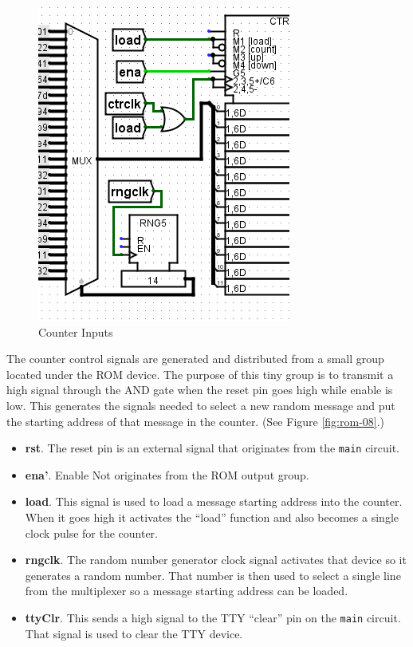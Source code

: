 \begin{figure}[H]
	\centering
	\includegraphics[width=\maxwidth{.95\linewidth}]{gfx/rom-07}
	\caption{Counter Inputs}
	\label{fig:rom-07}
\end{figure}

The counter control signals are generated and distributed from a small group located under the ROM device. The purpose of this tiny group is to transmit a high signal through the AND gate when the reset pin goes high while enable is low. This generates the signals needed to select a new random message and put the starting address of that message in the counter. (See Figure \ref{fig:rom-08}.)
 
\begin{itemize}
	\item \textbf{rst}. The reset pin is an external signal that originates from the \lstinline[columns=fixed]|main| circuit.
	\item \textbf{ena'}. Enable Not originates from the ROM output group.
	\item \textbf{load}. This signal is used to load a message starting address into the counter. When it goes high it activates the ``load'' function and also becomes a single clock pulse for the counter.
	\item \textbf{rngclk}. The random number generator clock signal activates that device so it generates a random number. That number is then used to select a single line from the multiplexer so a message starting address can be loaded.
	\item \textbf{ttyClr}. This sends a high signal to the TTY ``clear'' pin on the \lstinline[columns=fixed]|main| circuit. That signal is used to clear the TTY device.
\end{itemize}

